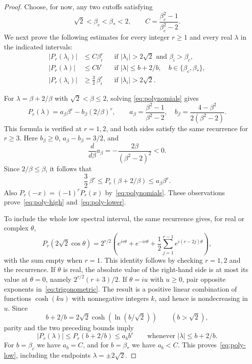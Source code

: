 \documentclass[11pt,a4paper]{article}
\begin{document}
\begin{proof}
Choose, for now, any two cutoffs satisfying
\begin{equation}\label{eq:cutoffs}
 \sqrt2<\beta_c<\beta_*<2,
 \qquad C=\frac{\beta_c^2-1}{\beta_c^2-2}.
\end{equation}
We next prove the following estimates for every integer $r\ge1$
and every real $\lambda$ in the indicated intervals:
\begin{align}
 |P_r(\lambda_i)|&\le C\beta_i^r
 &&\text{if }|\lambda_i|>2\sqrt2\text{ and }\beta_i>\beta_c,
 \label{eq:poly-high}\\
 |P_r(\lambda)|&\le Cb^r
 &&\text{if }|\lambda|\le b+2/b,
 \quad b\in\{\beta_c,\beta_*\},
 \label{eq:poly-low}\\
 |P_r(\lambda_i)|&\ge\frac32\,\beta_i^r
 &&\text{if }|\lambda_i|>2\sqrt2.
 \label{eq:poly-lower}
\end{align}

For $\lambda=\beta+2/\beta$ with $\sqrt2<\beta\le2$, solving
\eqref{eq:polynomials} gives
\begin{equation}\label{eq:poly-root-formula}
 P_r(\lambda)=a_\beta\beta^r-b_\beta(2/\beta)^r,
 \qquad
 a_\beta=\frac{\beta^2-1}{\beta^2-2},\quad
 b_\beta=\frac{4-\beta^2}{2(\beta^2-2)}.
\end{equation}
This formula is verified at $r=1,2$, and both sides satisfy the same
recurrence for $r\ge3$. Here $b_\beta\ge0$,
$a_\beta-b_\beta=3/2$, and
\[
 \frac{d}{d\beta}a_\beta
 =-\frac{2\beta}{(\beta^2-2)^2}<0.
\]
Since $2/\beta\le\beta$, it follows that
\begin{equation}\label{eq:poly-sandwich}
 \frac32\,\beta^r
 \le P_r(\beta+2/\beta)
 \le a_\beta\beta^r.
\end{equation}
Also $P_r(-x)=(-1)^rP_r(x)$ by~\eqref{eq:polynomials}.
These observations prove~\eqref{eq:poly-high}
and~\eqref{eq:poly-lower}.

To include the whole low spectral interval, the same recurrence gives,
for real or complex $\theta$,
\begin{equation}\label{eq:trigonometric}
 P_r(2\sqrt2\cos\theta)
 =2^{r/2}\left(
 e^{ir\theta}+e^{-ir\theta}
 +\frac12\sum_{j=1}^{r-1}e^{i(r-2j)\theta}
 \right),
\end{equation}
with the sum empty when $r=1$. This identity follows by checking
$r=1,2$ and the recurrence. If $\theta$ is real, the absolute value of
the right-hand side is at most its value at $\theta=0$, namely
$2^{r/2}(r+3)/2$. If $\theta=iu$ with $u\ge0$, pair opposite
exponents in~\eqref{eq:trigonometric}. The result is a positive linear
combination of functions $\cosh(ku)$ with nonnegative integers $k$,
and hence is nondecreasing in $u$. Since
\[
 b+2/b=2\sqrt2\cosh\!\left(\ln(b/\sqrt2)\right)
 \qquad(b>\sqrt2),
\]
parity and the two preceding bounds imply
\[
 |P_r(\lambda)|\le P_r(b+2/b)\le a_b b^r
 \qquad\text{whenever }|\lambda|\le b+2/b.
\]
For $b=\beta_c$ we have $a_b=C$, and for $b=\beta_*$ we have $a_b<C$.
This proves~\eqref{eq:poly-low}, including the endpoints
$\lambda=\pm2\sqrt2$.


\end{proof}
\end{document}
